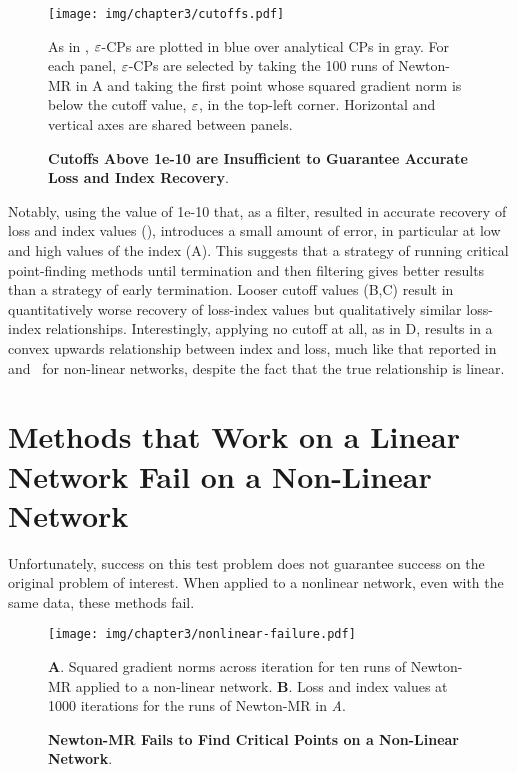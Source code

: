 \documentclass[../../thesis.tex]{subfiles}
\begin{document}
\begin{figure}[h]
	\begin{center}
		\texttt{[image: img/chapter3/cutoffs.pdf]}
	\end{center}
	\caption{\textbf{Cutoffs Above 1e-10 are Insufficient to Guarantee
	Accurate Loss and Index Recovery}.}{%
	As in ,
	$\varepsilon$-CPs are plotted in blue
	over analytical CPs in gray.
	For each panel,
	$\varepsilon$-CPs are selected by taking
	the 100 runs of Newton-MR in A
	and taking the first point whose squared gradient norm is below
	the cutoff value, $\varepsilon$, in the top-left corner.
	Horizontal and vertical axes are shared between panels.
}
\end{figure}

Notably, using the value of 1e-10
that, as a filter,
resulted in accurate recovery of loss and index values
(),
introduces a small amount of error,
in particular at low and high values of the index
(A).
This suggests that
a strategy of running
critical point-finding methods until termination
and then filtering
gives better results than
a strategy of early termination.
Looser cutoff values
(B,C)
result in quantitatively worse
recovery of loss-index values
but qualitatively similar loss-index relationships.
Interestingly, applying no cutoff at all,
as in D,
results in a convex upwards relationship
between index and loss,
much like that reported in~\cite{dauphin2014} and~\cite{pennington2017}
for non-linear networks,
despite the fact that the true relationship is linear.


\section{Methods that Work on a Linear Network Fail on a Non-Linear Network}%

Unfortunately,
success on this test problem does not guarantee
success on the original problem of interest.
When applied to a nonlinear network,
even with the same data,
these methods fail.

\begin{figure}[h]
	\begin{center}
		\texttt{[image: img/chapter3/nonlinear-failure.pdf]}
	\end{center}
	\caption{\textbf{Newton-MR Fails to Find Critical Points
	on a Non-Linear Network}.}
	\textbf{A}. Squared gradient norms across iteration
	for ten runs of Newton-MR applied to a non-linear network.
	\textbf{B}. Loss and index values at 1000 iterations
	for the runs of Newton-MR in \emph{A}.
\end{figure}
\end{document}
